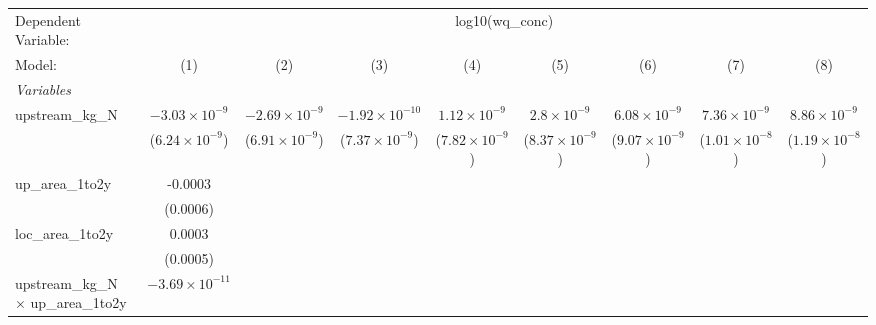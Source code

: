 
\begingroup
\centering
\begin{tabular}{lcccccccc}
   \tabularnewline \midrule \midrule
   Dependent Variable: & \multicolumn{8}{c}{log10(wq\_conc)}\\
   Model:                                         & (1)                      & (2)                      & (3)                      & (4)                      & (5)                      & (6)                      & (7)                      & (8)\\  
   \midrule
   \emph{Variables}\\
   upstream\_kg\_N                                & $-3.03\times 10^{-9}$    & $-2.69\times 10^{-9}$    & $-1.92\times 10^{-10}$   & $1.12\times 10^{-9}$     & $2.8\times 10^{-9}$      & $6.08\times 10^{-9}$     & $7.36\times 10^{-9}$     & $8.86\times 10^{-9}$\\    
                                                  & ($6.24\times 10^{-9}$)   & ($6.91\times 10^{-9}$)   & ($7.37\times 10^{-9}$)   & ($7.82\times 10^{-9}$)   & ($8.37\times 10^{-9}$)   & ($9.07\times 10^{-9}$)   & ($1.01\times 10^{-8}$)   & ($1.19\times 10^{-8}$)\\    
   up\_area\_1to2y                                & -0.0003                  &                          &                          &                          &                          &                          &                          &   \\   
                                                  & (0.0006)                 &                          &                          &                          &                          &                          &                          &   \\   
   loc\_area\_1to2y                               & 0.0003                   &                          &                          &                          &                          &                          &                          &   \\   
                                                  & (0.0005)                 &                          &                          &                          &                          &                          &                          &   \\   
   upstream\_kg\_N $\times$ up\_area\_1to2y       & $-3.69\times 10^{-11}$   &                          &                          &                          &                          &                          &                          &   \\   

\end{tabular}

